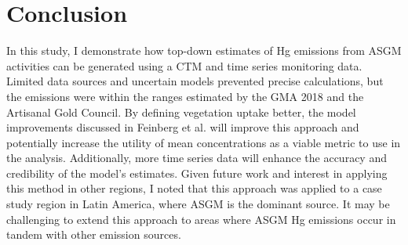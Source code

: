 \section{Conclusion}
\begin{flushleft}
In this study, I demonstrate how top-down estimates of Hg emissions from ASGM activities can be generated using a CTM and time series monitoring data. Limited data sources and uncertain models prevented precise calculations, but the emissions were within the ranges estimated by the GMA 2018\cite{steenhuisen_development_2019,united_nations_environment_programme_technical_2019} and the Artisanal Gold Council\cite{agc_reporte_2017}. By defining vegetation uptake better, the model improvements discussed in Feinberg et al.\cite{feinberg_evaluating_2022} will improve this approach and potentially increase the utility of mean concentrations as a viable metric to use in the analysis. Additionally, more time series data will enhance the accuracy and credibility of the model's estimates. Given future work and interest in applying this method in other regions, I noted that this approach was applied to a case study region in Latin America, where ASGM is the dominant source. It may be challenging to extend this approach to areas where ASGM Hg emissions occur in tandem with other emission sources.
 
\end{flushleft}
